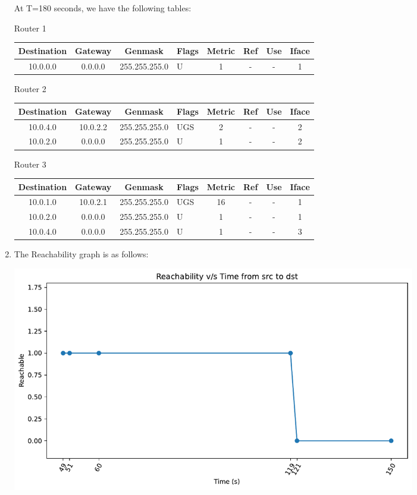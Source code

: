 \documentclass[12pt]{article}
\begin{document}
\begin{enumerate}[label=(\alph*)]
    At T=180 seconds, we have the following tables:

    \begin{center}
        Router 1

        \begin{tabular}{|c|c|c|l|c|c|c|c|}
            \hline
            Destination & Gateway & Genmask & Flags & Metric & Ref & Use & Iface \\
            \hline
            10.0.0.0 & 0.0.0.0 & 255.255.255.0 & U & 1 & - & - & 1 \\
            \hline
        \end{tabular}

        Router 2

        \begin{tabular}{|c|c|c|l|c|c|c|c|}
            \hline
            Destination & Gateway & Genmask & Flags & Metric & Ref & Use & Iface \\
            \hline
            10.0.4.0 & 10.0.2.2 & 255.255.255.0 & UGS & 2 & - & - & 2 \\
            10.0.2.0 & 0.0.0.0 & 255.255.255.0 & U & 1 & - & - & 2 \\
            \hline
        \end{tabular}

        Router 3

        \begin{tabular}{|c|c|c|l|c|c|c|c|}
            \hline
            Destination & Gateway & Genmask & Flags & Metric & Ref & Use & Iface \\
            \hline
            10.0.1.0 & 10.0.2.1 & 255.255.255.0 & UGS & 16 & - & - & 1 \\
            10.0.2.0 & 0.0.0.0 & 255.255.255.0 & U & 1 & - & - & 1 \\
            10.0.4.0 & 0.0.0.0 & 255.255.255.0 & U & 1 & - & - & 3 \\
            \hline
        \end{tabular}
    \end{center}

    \item The Reachability graph is as follows:
    \begin{center}
        \includegraphics[width=0.8\textwidth]{../Q2/q2b_reachable.pdf}
    \end{center}


\end{enumerate}
\end{document}
